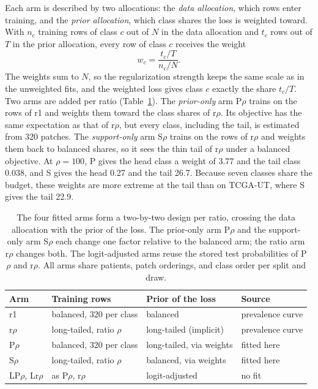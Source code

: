 \documentclass[11pt]{article}
\begin{document}
Each arm is described by two allocations: the \emph{data allocation}, which rows enter training, and the \emph{prior allocation}, which class shares the loss is weighted toward. With $n_c$ training rows of class $c$ out of $N$ in the data allocation and $t_c$ rows out of $T$ in the prior allocation, every row of class $c$ receives the weight
\begin{equation}
  w_c = \frac{t_c/T}{n_c/N}.
  \label{eq:weights}
\end{equation}
\noindent The weights sum to $N$, so the regularization strength keeps the same scale as in the unweighted fits, and the weighted loss gives class $c$ exactly the share $t_c/T$. Two arms are added per ratio (Table~\ref{tab:arms}). The \emph{prior-only} arm P$\rho$ trains on the rows of r1 and weights them toward the class shares of r$\rho$. Its objective has the same expectation as that of r$\rho$, but every class, including the tail, is estimated from 320 patches. The \emph{support-only} arm S$\rho$ trains on the rows of r$\rho$ and weights them back to balanced shares, so it sees the thin tail of r$\rho$ under a balanced objective. At $\rho=100$, P gives the head class a weight of 3.77 and the tail class 0.038, and S gives the head 0.27 and the tail 26.7. Because seven classes share the budget, these weights are more extreme at the tail than on TCGA-UT, where S gives the tail 22.9.

\begin{table}[htbp]
\centering
\renewcommand{\arraystretch}{1.15}
\begin{tabular}{@{}llll@{}}
\toprule
Arm & Training rows & Prior of the loss & Source \\
\midrule
r1 & balanced, 320 per class & balanced & prevalence curve \\
r$\rho$ & long-tailed, ratio $\rho$ & long-tailed (implicit) & prevalence curve \\
P$\rho$ & balanced, 320 per class & long-tailed, via weights & fitted here \\
S$\rho$ & long-tailed, ratio $\rho$ & balanced, via weights & fitted here \\
LP$\rho$, Lr$\rho$ & as P$\rho$, r$\rho$ & logit-adjusted & no fit \\
\bottomrule
\end{tabular}
\caption{The four fitted arms form a two-by-two design per ratio, crossing the data allocation with the prior of the loss. The prior-only arm P$\rho$ and the support-only arm S$\rho$ each change one factor relative to the balanced arm; the ratio arm r$\rho$ changes both. The logit-adjusted arms reuse the stored test probabilities of P$\rho$ and r$\rho$. All arms share patients, patch orderings, and class order per split and draw.}
\label{tab:arms}
\end{table}
\end{document}
